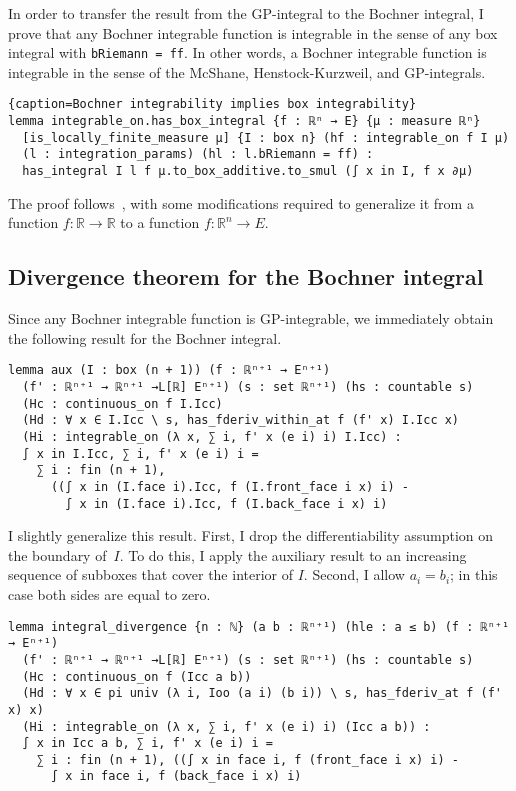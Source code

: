 \documentclass[a4paper,UKenglish,cleveref, autoref, thm-restate]{lipics-v2021}
\newcommand{\bbR}{\mathbb{R}}
\begin{document}
In order to transfer the result from the GP-integral to the Bochner
integral, I prove that any Bochner integrable function is integrable
in the sense of any box integral with \lstinline~bRiemann = ff~. In
other words, a Bochner integrable function is integrable in the sense
of the McShane, Henstock-Kurzweil, and GP-integrals.

\begin{lstlisting}{caption=Bochner integrability implies box integrability}
lemma integrable_on.has_box_integral {f : ℝⁿ → E} {μ : measure ℝⁿ}
  [is_locally_finite_measure μ] {I : box n} (hf : integrable_on f I μ)
  (l : integration_params) (hl : l.bRiemann = ff) :
  has_integral I l f μ.to_box_additive.to_smul (∫ x in I, f x ∂μ)
\end{lstlisting}

The proof follows~\cite{Gordon55}, with some modifications required to
generalize it from a function \(f\colon\bbR\to\bbR\) to a function
\(f\colon\bbR^{n}\to E\).

\subsection{Divergence theorem for the Bochner integral}%
\label{sec:diverg-theor-bochn}

Since any Bochner integrable function is GP-integrable, we immediately
obtain the following result for the Bochner integral.

\begin{lstlisting}
lemma aux (I : box (n + 1)) (f : ℝⁿ⁺¹ → Eⁿ⁺¹)
  (f' : ℝⁿ⁺¹ → ℝⁿ⁺¹ →L[ℝ] Eⁿ⁺¹) (s : set ℝⁿ⁺¹) (hs : countable s)
  (Hc : continuous_on f I.Icc)
  (Hd : ∀ x ∈ I.Icc \ s, has_fderiv_within_at f (f' x) I.Icc x)
  (Hi : integrable_on (λ x, ∑ i, f' x (e i) i) I.Icc) :
  ∫ x in I.Icc, ∑ i, f' x (e i) i =
    ∑ i : fin (n + 1),
      ((∫ x in (I.face i).Icc, f (I.front_face i x) i) -
        ∫ x in (I.face i).Icc, f (I.back_face i x) i)
\end{lstlisting}

I slightly generalize this result. First, I drop the differentiability
assumption on the boundary of~\(I\). To do this, I apply the auxiliary
result to an increasing sequence of subboxes that cover the interior
of \(I\). Second, I allow \(a_{i}=b_{i}\); in this case both sides are
equal to zero.

\begin{lstlisting}[caption={The divergence theorem for the Bochner integral},label=lst:divergence-bochner]
lemma integral_divergence {n : ℕ} (a b : ℝⁿ⁺¹) (hle : a ≤ b) (f : ℝⁿ⁺¹ → Eⁿ⁺¹)
  (f' : ℝⁿ⁺¹ → ℝⁿ⁺¹ →L[ℝ] Eⁿ⁺¹) (s : set ℝⁿ⁺¹) (hs : countable s)
  (Hc : continuous_on f (Icc a b))
  (Hd : ∀ x ∈ pi univ (λ i, Ioo (a i) (b i)) \ s, has_fderiv_at f (f' x) x)
  (Hi : integrable_on (λ x, ∑ i, f' x (e i) i) (Icc a b)) :
  ∫ x in Icc a b, ∑ i, f' x (e i) i =
    ∑ i : fin (n + 1), ((∫ x in face i, f (front_face i x) i) -
      ∫ x in face i, f (back_face i x) i)
\end{lstlisting}
\end{document}
